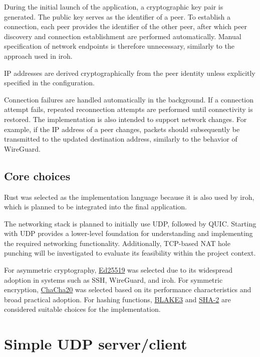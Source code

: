 \documentclass[a4paper, 10pt]{article}
\let\oldsection\section
\renewcommand{\section}{
  \clearpage
  \oldsection
}
\begin{document}
During the initial launch of the application, a cryptographic key pair is generated.
The public key serves as the identifier of a peer.
To establish a connection, each peer provides the identifier of the other peer, after which peer discovery and connection establishment are performed automatically.
Manual specification of network endpoints is therefore unnecessary, similarly to the approach used in iroh.

IP addresses are derived cryptographically from the peer identity unless explicitly specified in the configuration.

Connection failures are handled automatically in the background.
If a connection attempt fails, repeated reconnection attempts are performed until connectivity is restored.
The implementation is also intended to support network changes.
For example, if the IP address of a peer changes, packets should subsequently be transmitted to the updated destination address, similarly to the behavior of WireGuard.

\subsection{Core choices}

Rust was selected as the implementation language because it is also used by iroh, which is planned to be integrated into the final application.

The networking stack is planned to initially use UDP, followed by QUIC.
Starting with UDP provides a lower-level foundation for understanding and implementing the required networking functionality.
Additionally, TCP-based NAT hole punching will be investigated to evaluate its feasibility within the project context.

For asymmetric cryptography,
\href{https://en.wikipedia.org/wiki/EdDSA#Ed25519}{Ed25519}
was selected due to its widespread adoption in systems such as SSH, WireGuard, and iroh.
For symmetric encryption,
\href{https://en.wikipedia.org/wiki/ChaCha20-Poly1305}{ChaCha20}
was selected based on its performance characteristics and broad practical adoption.
For hashing functions,
\href{https://en.wikipedia.org/wiki/BLAKE_(hash_function)}{BLAKE3}
and
\href{https://en.wikipedia.org/wiki/SHA-2}{SHA-2}
are considered suitable choices for the implementation.


\section{Simple UDP server/client}
\end{document}
